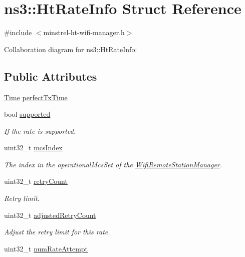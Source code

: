 \hypertarget{structns3_1_1HtRateInfo}{}\section{ns3\+:\+:Ht\+Rate\+Info Struct Reference}
\label{structns3_1_1HtRateInfo}


{\ttfamily \#include $<$minstrel-\/ht-\/wifi-\/manager.\+h$>$}



Collaboration diagram for ns3\+:\+:Ht\+Rate\+Info\+:
\subsection*{Public Attributes}
\begin{DoxyCompactItemize}
\item 
\hyperlink{classns3_1_1Time}{Time} \hyperlink{structns3_1_1HtRateInfo_a66101cd7c403ad7d1df0532eca3e9354}{perfect\+Tx\+Time}
\item 
bool \hyperlink{structns3_1_1HtRateInfo_a275d7a8743ff7048490482d3c56d7eb3}{supported}
\begin{DoxyCompactList}\small\item\em If the rate is supported. \end{DoxyCompactList}\item 
uint32\+\_\+t \hyperlink{structns3_1_1HtRateInfo_af40711b19c3d3cad63d895f0dab2ea13}{mcs\+Index}
\begin{DoxyCompactList}\small\item\em The index in the operational\+Mcs\+Set of the \hyperlink{classns3_1_1WifiRemoteStationManager}{Wifi\+Remote\+Station\+Manager}. \end{DoxyCompactList}\item 
uint32\+\_\+t \hyperlink{structns3_1_1HtRateInfo_ae33b54c8cb8ec9da90af5ebcb9e79bb9}{retry\+Count}
\begin{DoxyCompactList}\small\item\em Retry limit. \end{DoxyCompactList}\item 
uint32\+\_\+t \hyperlink{structns3_1_1HtRateInfo_ad64e7a7ad5d380145615b2fc9b53454c}{adjusted\+Retry\+Count}
\begin{DoxyCompactList}\small\item\em Adjust the retry limit for this rate. \end{DoxyCompactList}\item 
uint32\+\_\+t \hyperlink{structns3_1_1HtRateInfo_aeb81fc5eafcf17e4b766995caf53ba99}{num\+Rate\+Attempt}

\end{DoxyCompactItemize}
